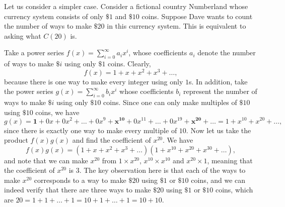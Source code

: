 Let us consider a simpler case. Consider a fictional country Numberland whose currency system consists of only $\$1$ and $\$10$ coins. Suppose Dave wants to count the number of ways to make  $\$ 20$ in this currency system. This is equivalent to asking what $C(20)$ is.

Take a power series $f(x) = \sum_{i=0}^{\infty} a_ix^{i}$, whose coefficients $a_i$ denote the number of ways to make $\$ i$ using only $\$1$ coins. Clearly, \[
  f(x) = 1 + x + x^{2} + x^{3} + \dots
,\] because there is one way to make every integer using only $1$s. In addition, take the power series $g(x) = \sum_{i=0}^{\infty} b_ix^{i}$ whose coefficients $b_i$ represent the number of ways to make $\$ i$ using only $\$ 10$ coins. Since one can only make multiples of $\$10$ using $\$10$ coins, we have \[
g(x) = \bm{1} + 0x + 0x^2 + \dots + 0x^{9} + \bm{x^{10}} + 0x^{11} + \dots + 0x^{19} + \bm{x^{20}} + \dots = 1 + x^{10} + x^{20} + \dots
,\] since there is exactly one way to make every multiple of $10$. Now let us take the product $f(x)g(x)$ and find the coefficient of $x^{20}$. We have \[
  f(x)g(x) = (1+x+x^{2}+x^{3} + \dots) (1+x^{10} + x^{20} + x^{30} + \dots)
,\] and note that we can make $x^{20}$ from $1\times x^{20}$, $x^{10}\times x^{10}$ and $x^{20}\times 1$, meaning that the coefficient of $x^{20}$ is $3$. The key observation here is that each of the ways to make $x^{20}$ corresponds to a way to make $\$20$ using $\$1$ or $\$10$ coins, and we can indeed verify that there are three ways to make $\$20$ using $\$1$ or $\$10$ coins, which are $20 = 1 + 1 + \dots + 1 = 10 + 1 + \dots + 1 = 10 + 10$.

